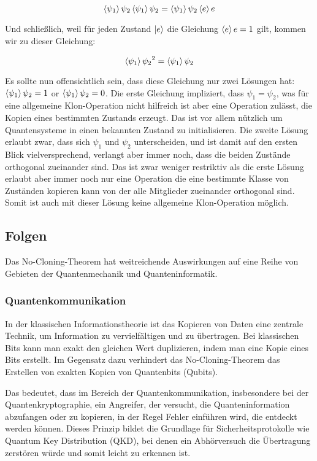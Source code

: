 \begin{equation}
    \braket{\psi_1}{\psi_2}\braket{\psi_1}{\psi_2}=\braket{\psi_1}{\psi_2}\braket{e}{e}
    \label{eq:scalar_equals}
\end{equation}

Und schließlich, weil für jeden Zustand $\lvert e\rangle$ die Gleichung $\braket{e}{e} = 1$ gilt, kommen wir zu dieser Gleichung:

\begin{equation}
    \braket{\psi_1}{\psi_2}^2 = \braket{\psi_1}{\psi_2}
    \label{eq:square_equals_single}
\end{equation}

Es sollte nun offensichtlich sein, dass diese Gleichung nur zwei Lösungen hat:
$\braket{\psi_1}{\psi_2} = 1$ or $\braket{\psi_1}{\psi_2} = 0$.
Die erste Gleichung impliziert, dass $\psi_1 = \psi_2$, was für eine allgemeine Klon-Operation nicht hilfreich ist aber eine
Operation zulässt, die Kopien eines bestimmten Zustands erzeugt.
Das ist vor allem nützlich um Quantensysteme in einen bekannten Zustand zu initialisieren.
Die zweite Lösung erlaubt zwar, dass sich $\psi_1$ und $\psi_2$ unterscheiden, und ist damit auf den ersten Blick
vielversprechend, verlangt aber immer noch, dass die beiden Zustände orthogonal zueinander sind.
Das ist zwar weniger restriktiv als die erste Lösung erlaubt aber immer noch nur eine Operation die eine bestimmte Klasse
von Zuständen kopieren kann von der alle Mitglieder zueinander orthogonal sind.
Somit ist auch mit dieser Lösung keine allgemeine Klon-Operation möglich.
\subsection{Folgen}\label{subsec:implications}
Das No-Cloning-Theorem hat weitreichende Auswirkungen auf eine Reihe von Gebieten der
Quantenmechanik und Quanteninformatik.

\subsubsection{Quantenkommunikation}
In der klassischen Informationstheorie ist das Kopieren von Daten eine zentrale Technik, um Information zu vervielfältigen und zu übertragen.
Bei klassischen Bits kann man exakt den gleichen Wert duplizieren, indem man eine Kopie eines Bits erstellt.
Im Gegensatz dazu verhindert das No-Cloning-Theorem das Erstellen von exakten Kopien von Quantenbits (Qubits).

Das bedeutet, dass im Bereich der Quantenkommunikation, insbesondere bei der Quantenkryptographie, ein Angreifer,
der versucht, die Quanteninformation abzufangen oder zu kopieren, in der Regel Fehler einführen wird, die entdeckt werden können.
Dieses Prinzip bildet die Grundlage für Sicherheitsprotokolle wie Quantum Key Distribution (QKD),
bei denen ein Abhörversuch die Übertragung zerstören würde und somit leicht zu erkennen ist.

